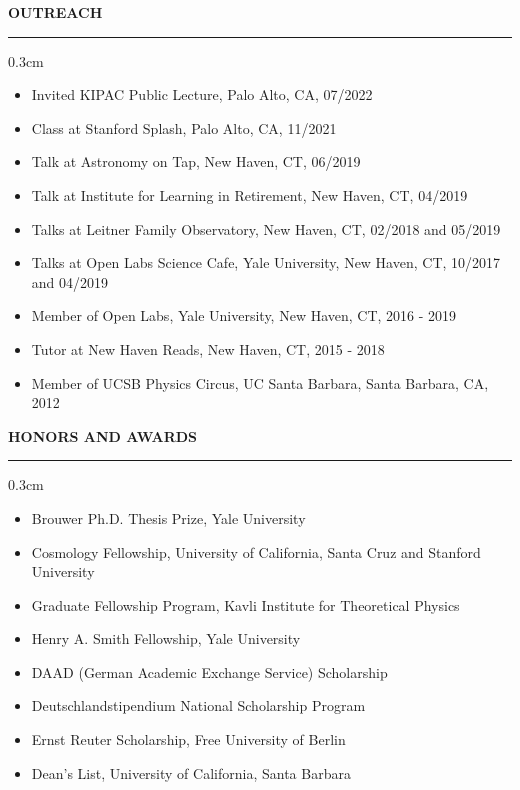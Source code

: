 \documentclass[12pt]{article}
\renewenvironment{section}[1]
  {
  \medskip
  {\color{aublue} \MakeUppercase{\bf #1}}
  \smallskip
  \hrule
  \medskip
  \begin{adjustwidth}{0.3cm}{}
  }
  {
  \end{adjustwidth}
  }
\begin{document}
\begin{section}{Outreach}
  \begin{itemize}[leftmargin=0.5cm, topsep=0pt, itemsep=0pt, partopsep=0pt, parsep=0pt]
    \item Invited KIPAC Public Lecture, Palo Alto, CA, 07/2022
    \item Class at Stanford Splash, Palo Alto, CA, 11/2021
    \item Talk at Astronomy on Tap, New Haven, CT, 06/2019
    \item Talk at Institute for Learning in Retirement, New Haven, CT, 04/2019
    \item Talks at Leitner Family Observatory, New Haven, CT, 02/2018 and 05/2019
    \item Talks at Open Labs Science Cafe, Yale University, New Haven, CT, 10/2017 and 04/2019
    \item Member of Open Labs, Yale University, New Haven, CT, 2016 - 2019
    \item Tutor at New Haven Reads, New Haven, CT, 2015 - 2018
    \item Member of UCSB Physics Circus, UC Santa Barbara, Santa Barbara, CA, 2012
  \end{itemize}
\end{section}

\begin{section}{Honors and Awards}
  \begin{itemize}[leftmargin=0.5cm, topsep=0pt, itemsep=0pt, partopsep=0pt, parsep=0pt]
    \item Brouwer Ph.D. Thesis Prize, Yale University
    \item Cosmology Fellowship, University of California, Santa Cruz and Stanford University
    \item Graduate Fellowship Program, Kavli Institute for Theoretical Physics
    \item Henry A. Smith Fellowship, Yale University
    \item DAAD (German Academic Exchange Service) Scholarship
    \item Deutschlandstipendium National Scholarship Program
    \item Ernst Reuter Scholarship, Free University of Berlin
    \item Dean's List, University of California, Santa Barbara
  \end{itemize}
\end{section}
\end{document}

